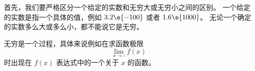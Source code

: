 

首先，我们要严格区分一个给定的实数和无穷大或无穷小之间的区别。 一个给定的实数是指一个具体的值，例如 $3.2\e{-100}$ 或者 $1.6\e{1000}$。 无论一个确定的实数多么大或多么小，都不能说它是无穷。

无穷是一个过程，具体来说例如在求函数极限
\begin{equation}
\lim_{x\to \square} f(x)~
\end{equation}
时出现在 $f(x)$ 表达式中的一个关于 $x$ 的函数。
